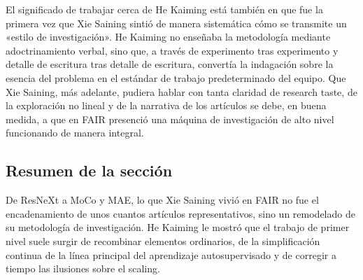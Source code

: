 El significado de trabajar cerca de He Kaiming está también en que fue la primera vez que Xie Saining sintió de manera sistemática cómo se transmite un «estilo de investigación». He Kaiming no enseñaba la metodología mediante adoctrinamiento verbal, sino que, a través de experimento tras experimento y detalle de escritura tras detalle de escritura, convertía la indagación sobre la esencia del problema en el estándar de trabajo predeterminado del equipo. Que Xie Saining, más adelante, pudiera hablar con tanta claridad de research taste, de la exploración no lineal y de la narrativa de los artículos se debe, en buena medida, a que en FAIR presenció una máquina de investigación de alto nivel funcionando de manera integral.

\subsection{Resumen de la sección}

De ResNeXt a MoCo y MAE, lo que Xie Saining vivió en FAIR no fue el encadenamiento de unos cuantos artículos representativos, sino un remodelado de su metodología de investigación. He Kaiming le mostró que el trabajo de primer nivel suele surgir de recombinar elementos ordinarios, de la simplificación continua de la línea principal del aprendizaje autosupervisado y de corregir a tiempo las ilusiones sobre el scaling.

